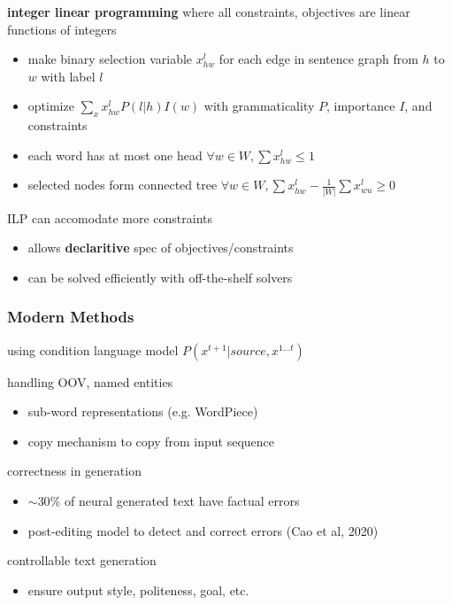\documentclass[]{article}
\theoremstyle{definition}
\begin{document}
\textbf{integer linear programming} where all constraints, objectives are linear functions of integers
\begin{itemize}
    \item make binary selection variable $x_{hw}^{l}$ for each edge in sentence graph from $h$ to $w$ with label $l$
    \item optimize $\sum_x x_{hw}^{l} P(l|h) I(w)$ with grammaticality $P$, importance $I$, and constraints
    \item each word has at most one head $\forall w \in W, \sum x_{hw}^l \leq 1$
    \item selected nodes form connected tree $\forall w \in W, \sum x_{hw}^l - \frac{1}{|W|}\sum x_{wu}^l \geq 0$
\end{itemize}

ILP can accomodate more constraints
\begin{itemize}
    \item allows \textbf{declaritive} spec of objectives/constraints
    \item can be solved efficiently with off-the-shelf solvers
\end{itemize}

\subsubsection{Modern Methods}%
\label{ssub:modern_methods}

using condition language model $P(x^{t+1} | source, x^{1 \ldots t})$

handling OOV, named entities
\begin{itemize}
    \item sub-word representations (e.g. WordPiece)
    \item copy mechanism to copy from input sequence
\end{itemize}

correctness in generation
\begin{itemize}
    \item $\sim 30\%$ of neural generated text have factual errors
    \item post-editing model to detect and correct errors (Cao et al, 2020)
\end{itemize}

controllable text generation
\begin{itemize}
    \item ensure output style, politeness, goal, etc.
\end{itemize}
\end{document}
